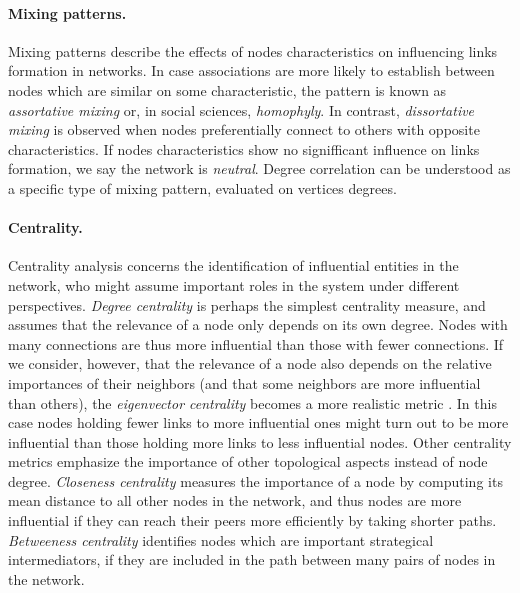 \paragraph*{Mixing patterns.}
Mixing patterns describe the effects of nodes characteristics on influencing links formation in networks.
In case associations are more likely to establish between nodes which are similar on some characteristic, the pattern is known as \textit{assortative mixing} or, in social sciences, \textit{homophyly}.
In contrast, \textit{dissortative mixing} is observed when nodes preferentially connect to others with opposite characteristics. 
If nodes characteristics show no signifficant influence on links formation, we say the network is \textit{neutral}.
Degree correlation can be understood as a specific type of mixing pattern, evaluated on vertices degrees.

\paragraph*{Centrality.}
Centrality analysis concerns the identification of influential entities in the network, who might assume important roles in the system under different perspectives.
\textit{Degree centrality} is perhaps the simplest centrality measure, and assumes that the relevance of a node only depends on its own degree. Nodes with many connections are thus more influential than those with fewer connections.
If we consider, however, that the relevance of a node also depends on the relative importances of their neighbors (and that some neighbors are more influential than others), the \textit{eigenvector centrality} becomes a more realistic metric \cite{Bonacich1987}.
In this case nodes holding fewer links to more influential ones might turn out to be more influential than those holding more links to less influential nodes.
Other centrality metrics emphasize the importance of other topological aspects instead of node degree.
\textit{Closeness centrality} measures the importance of a node by computing its mean distance to all other nodes in the network, and thus nodes are more influential if they can reach their peers more efficiently by taking shorter paths.
\textit{Betweeness centrality} identifies nodes which are important strategical intermediators, if they are included in the path between many pairs of nodes in the network.  

